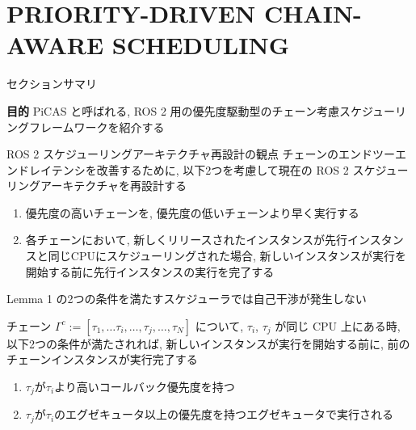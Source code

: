
\section{PRIORITY-DRIVEN CHAIN-AWARE SCHEDULING}
\label{sec: priority-driven chain-aware scheduling}

\begin{frame}{セクションサマリ}
    \begin{itembox}[l]{\textbf{目的}}
        PiCAS と呼ばれる, ROS 2 用の優先度駆動型のチェーン考慮スケジューリングフレームワークを紹介する
    \end{itembox}
\end{frame}

\begin{frame}{ROS 2 スケジューリングアーキテクチャ再設計の観点}
    チェーンのエンドツーエンドレイテンシを改善するために, 以下2つを考慮して現在の ROS 2 スケジューリングアーキテクチャを再設計する
    \begin{enumerate}
        \item 優先度の高いチェーンを, 優先度の低いチェーンより早く実行する
        \item 各チェーンにおいて, 新しくリリースされたインスタンスが先行インスタンスと同じCPUにスケジューリングされた場合, 新しいインスタンスが実行を開始する前に先行インスタンスの実行を完了する
    \end{enumerate}
\end{frame}

\begin{frame}[label=lemma1]{Lemma 1}
     の2つの条件を満たすスケジューラでは自己干渉が発生しない
    \begin{lemma}[]
        チェーン $\Gamma^{c}:=\left[\tau_{1}, \ldots \tau_{i}, \ldots, \tau_{j}, \ldots, \tau_{N}\right]$ について, $\tau_{i}$, $\tau_{j}$ が同じ CPU 上にある時, 以下2つの条件が満たされれば, 新しいインスタンスが実行を開始する前に, 前のチェーンインスタンスが実行完了する
        \begin{enumerate}
            \item $\tau_{j}$が$\tau_{i}$より高いコールバック優先度を持つ
            \item $\tau_{j}$が$\tau_{i}$のエグゼキュータ以上の優先度を持つエグゼキュータで実行される
        \end{enumerate}
    \end{lemma}
\end{frame}

